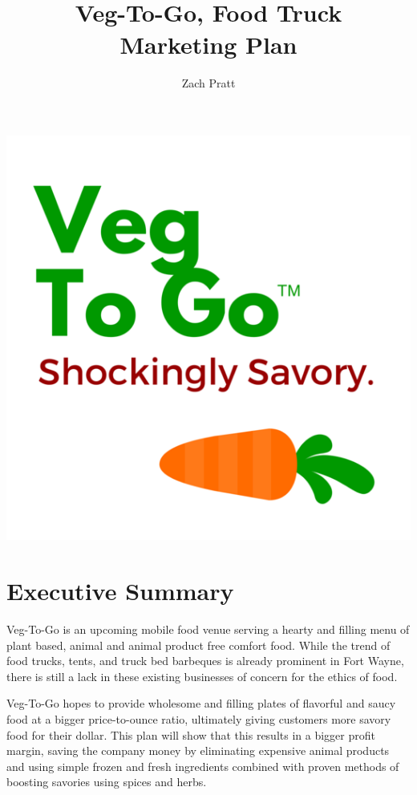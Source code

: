 \documentclass[12pt, letterpaper]{article}
\newcommand{\companyname}{Veg-To-Go}
\begin{document}
\includegraphics[width=\textwidth]{VegToGoLogo}

\newpage{}

\title{\companyname{},\textsuperscript{\texttrademark} Food Truck\\ Marketing Plan}
\author{Zach Pratt}
\maketitle

\newpage

\renewcommand\contentsname{Table of Contents}
\renewcommand{\cftsecleader}{\cftdotfill{\cftdotsep}}
\tableofcontents

\newpage

\section{Executive Summary}
Veg-To-Go is an upcoming mobile food venue serving a hearty and filling menu of plant based, animal and animal product free comfort food.  While the trend of food trucks, tents, and truck bed barbeques is already prominent in Fort Wayne, there is still a lack in these existing businesses of concern for the ethics of food.

Veg-To-Go hopes to provide wholesome and filling plates of flavorful and saucy food at a bigger price-to-ounce ratio, ultimately giving customers more savory food for their dollar.  This plan will show that this results in a bigger profit margin, saving the company money by eliminating expensive animal products and using simple frozen and fresh ingredients combined with proven methods of boosting savories using spices and herbs.
\end{document}
